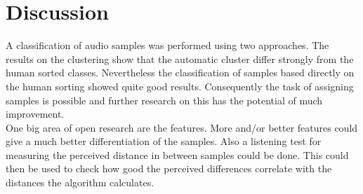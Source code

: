\section{Discussion}
A classification of audio samples was performed using two approaches. The results on the clustering show that the automatic cluster differ strongly from the human sorted classes. Nevertheless the classification of samples based directly on the human sorting showed quite good results. Consequently the task of assigning samples is possible and further research on this has the potential of much improvement.\\
One big area of open research are the features. More and/or better features could give a much better differentiation of the samples. Also a listening test for measuring the perceived distance in between samples could be done. This could then be used to check how good the perceived differences correlate with the distances the algorithm calculates.